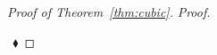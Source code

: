 \documentclass[12pt,a4paper]{article}
\newcommand{\set}[1]{\ensuremath{\left\{#1 \right\}}}
\newenvironment{proofclaim}[1][]%
    {\noindent \emph{Proof.} {}{#1}{}}{$~$\hfill $~\blacklozenge$ \vspace{0.2cm}}
\begin{document}
\begin{proof}[Proof of Theorem~\ref{thm:cubic}]
\begin{proofclaim}
%		
%		
%		
%		
		

\end{proofclaim}
\end{proof}
\end{document}
